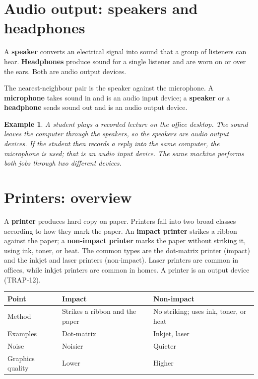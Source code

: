 \documentclass[11pt]{article}
\newtheorem{example}{Example}[section]
\begin{document}
\section{Audio output: speakers and headphones}
A \textbf{speaker} converts an electrical signal into sound that a group of
listeners can hear. \textbf{Headphones} produce sound for a single listener
and are worn on or over the ears. Both are audio output devices.

The nearest-neighbour pair is the speaker against the microphone. A
\textbf{microphone} takes sound in and is an audio input device; a
\textbf{speaker} or a \textbf{headphone} sends sound out and is an audio
output device.

\begin{example}
A student plays a recorded lecture on the office desktop. The sound leaves the
computer through the speakers, so the speakers are audio output devices. If
the student then records a reply into the same computer, the microphone is
used; that is an audio input device. The same machine performs both jobs
through two different devices.
\end{example}

\section{Printers: overview}
A \textbf{printer} produces hard copy on paper. Printers fall into two broad
classes according to how they mark the paper. An \textbf{impact printer}
strikes a ribbon against the paper; a \textbf{non-impact printer} marks the
paper without striking it, using ink, toner, or heat. The common types are the
dot-matrix printer (impact) and the inkjet and laser printers (non-impact).
Laser printers are common in offices, while inkjet printers are common in
homes. A printer is an output device (TRAP-12).

\begin{center}
\begin{tabular}{p{}p{}p{}}
\toprule
\textbf{Point} & \textbf{Impact} & \textbf{Non-impact} \\
\midrule
Method & Strikes a ribbon and the paper & No striking; uses ink, toner, or heat \\
Examples & Dot-matrix & Inkjet, laser \\
Noise & Noisier & Quieter \\
Graphics quality & Lower & Higher \\
\bottomrule
\end{tabular}
\end{center}
\end{document}
